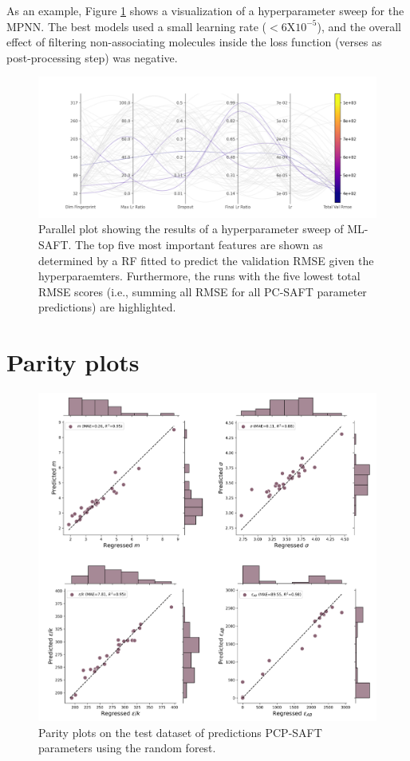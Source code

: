 As an example, Figure \ref{fig:ML-SAFT_sweep_parallel_plot} shows a visualization of a hyperparameter sweep for the MPNN. The best models used a small learning rate ($<6\text{X}  10^{-5}$), and the overall effect of filtering non-associating molecules inside the loss function (verses as post-processing step) was negative.

\begin{figure}
    \centering
    \includegraphics[width=\textwidth]{gfx/Chapter07/pyg_sweep_u157us_parallel_plot_total_val_rmse.png}
    \caption{Parallel plot showing the results of a hyperparameter sweep of ML-SAFT. The top five most important features are shown as determined by a RF fitted to predict the validation RMSE given the hyperparaemters. Furthermore, the runs with the five lowest total RMSE scores (i.e., summing all RMSE for all PC-SAFT parameter predictions) are highlighted.}
    \label{fig:ML-SAFT_sweep_parallel_plot}
\end{figure}

\section{Parity plots}\label{app:parity}

\begin{figure}
    \centering
    \includegraphics[width=\textwidth]{gfx/Chapter07/rf_parity_plots.png}
    \caption{Parity plots on the test dataset of predictions PCP-SAFT parameters using the random forest.}
    \label{fig:rf}
\end{figure}



